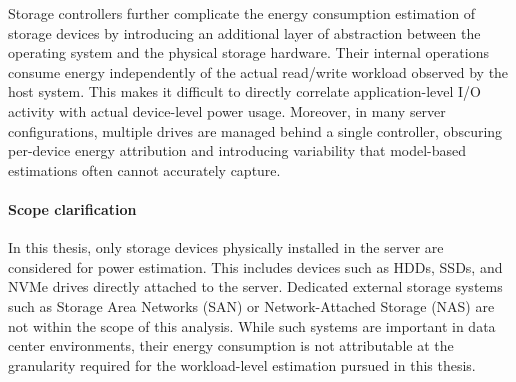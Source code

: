 Storage controllers further complicate the energy consumption estimation of storage devices by introducing an additional layer of abstraction between the operating system and the physical storage hardware. Their internal operations consume energy independently of the actual read/write workload observed by the host system. This makes it difficult to directly correlate application-level I/O activity with actual device-level power usage. Moreover, in many server configurations, multiple drives are managed behind a single controller, obscuring per-device energy attribution and introducing variability that model-based estimations often cannot accurately capture.

\paragraph{Scope clarification} 
In this thesis, only storage devices physically installed in the server are considered for power estimation. This includes devices such as HDDs, SSDs, and NVMe drives directly attached to the server. Dedicated external storage systems such as Storage Area Networks (SAN) or Network-Attached Storage (NAS) are not within the scope of this analysis. While such systems are important in data center environments, their energy consumption is not attributable at the granularity required for the workload-level estimation pursued in this thesis.

